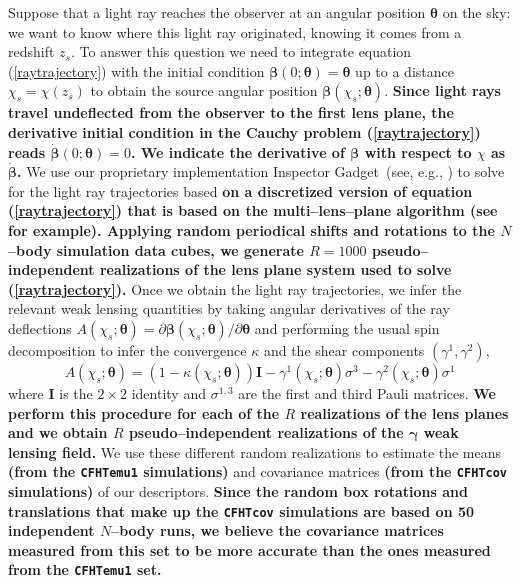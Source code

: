\documentclass[reprint,aps,prd,superscriptaddress,showkeys,showpacs]{revtex4-1}
\begin{document}
Suppose that a light ray reaches the observer at an angular position
$\pmb{\theta}$ on the sky: we want to know where this light ray
originated, knowing it comes from a redshift $z_s$. To answer this
question we need to integrate equation (\ref{raytrajectory}) with the
initial condition $\pmb{\beta}(0;\pmb{\theta})=\pmb{\theta}$ up to a distance
$\chi_s=\chi(z_s)$ to obtain the source angular position
$\pmb{\beta}(\chi_s;\pmb{\theta})$. \textbf{Since light rays travel undeflected from the observer to the first lens plane, the derivative initial condition in the Cauchy problem (\ref{raytrajectory}) reads $\dot{\pmb{\beta}}(0;\pmb{\theta})=0$. We indicate the derivative of $\pmb{\beta}$ with respect to $\chi$ as $\dot{\pmb{\beta}}$.} 
%
We use our proprietary implementation Inspector Gadget~(see, e.g., \cite{KHM2010}) to solve
for the light ray trajectories based \textbf{on a discretized version of equation (\ref{raytrajectory}) that is based on the multi--lens--plane algorithm (see \citep{RayTracingHartlap} for example).
Applying random periodical shifts and rotations to the $N$--body simulation data cubes, we generate $R=1000$ pseudo--independent realizations of the lens plane system used to solve (\ref{raytrajectory}).} 
%
Once we obtain the light ray trajectories, we infer the relevant weak
lensing quantities by taking angular derivatives of the ray
deflections $A(\chi_s;\pmb{\theta}) = \partial
\pmb{\beta}(\chi_s;\pmb{\theta})/\partial\pmb{\theta}$ and performing
the usual spin decomposition to infer the convergence $\kappa$ and the
shear components $(\gamma^1,\gamma^2)$,
\begin{equation}
A(\chi_s;\pmb{\theta}) = (1-\kappa(\chi_s;\pmb{\theta}))\pmb{I} - \gamma^1(\chi_s;\pmb{\theta})\sigma^3 - \gamma^2(\chi_s;\pmb{\theta})\sigma^1
\end{equation}  
where $\pmb{I}$ is the $2\times2$ identity and $\sigma^{1,3}$ are the
first and third Pauli matrices. \textbf{We perform this procedure for each of the $R$ realizations of the lens planes and we obtain $R$ pseudo--independent realizations of the $\pmb{\gamma}$ weak lensing field.} We use these different random realizations to estimate the means \textbf{(from the \texttt{CFHTemu1} simulations)} and covariance matrices \textbf{(from the \texttt{CFHTcov} simulations)} of our descriptors. \textbf{Since the random box rotations and translations that make up the \texttt{CFHTcov} simulations are based on 50 independent $N$--body runs, we believe the covariance matrices measured from this set to be more accurate than the ones measured from the \texttt{CFHTemu1} set.} 
\end{document}
